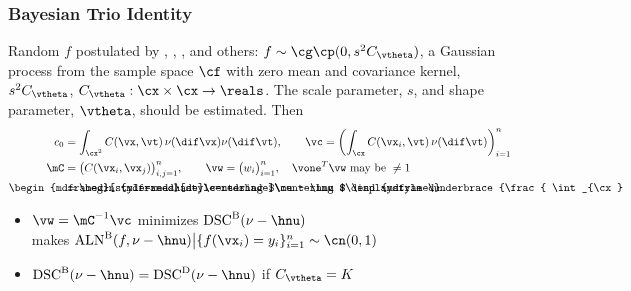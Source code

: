 \documentclass[10pt,compress,xcolor={usenames,dvipsnames}]{beamer} %
\DeclareMathOperator{\algn}{ALN}
\DeclareMathOperator{\disc}{DSC}
\DeclareMathOperator{\Var}{VAR}
\DeclareMathOperator{\GP}{\cg\cp}
\newcommand{\Dt}{\text{D}}
\newcommand{\Ba}{\text{B}}
\newcommand{\redroundmathbox}[1]{\parbox{\widthof{$#1$\hspace{1em}}}
	{\begin{mdframed}[style=redshade]\centering $#1$ \end{mdframed}}}
\begin{document}
\begin{frame}
	\frametitle{Bayesian Trio Identity}
	\vspace*{-4ex}
	\alert{Random} $f$ postulated by , , ,  and others:  $f \sim \GP (0, s^2C_{\vtheta})$,  a \alert{Gaussian process} from the sample space $\cf$ with zero mean and covariance kernel, $s^2C_{\vtheta}$, $C_{\vtheta}:\cx \times \cx \to \reals$. The \alert{scale parameter}, $s$, and \alert{shape parameter}, $\vtheta$, should be estimated.  	 Then 
	\vspace{-1ex}
	\begin{align*}
	c_0 & = \int_{\cx^2} C(\vx,\vt) \, \nu(\dif \vx) \nu(\dif \vt), \qquad \vc = \biggl( \int_{\cx} C(\vx_i,\vt) \,\nu(\dif \vt) \biggr)_{i=1}^n \\
	\mC & = \bigl( C(\vx_i,\vx_j) \bigr)_{i,j=1}^n, \qquad \vw = \bigl(w_i \bigr)_{i=1}^n,  \quad \vone^T \vw \text{ may be } \ne 1\\
	\redroundmathbox{\mu - \hmu} 
	& = \redroundmathbox{\displaystyle%
		\underbrace{\frac{ \int_{\cx} f(\vx) \, (\nu - \hnu)(\dif\vx)}{s \sqrt{c_0 - 2 \vc^T \vw + \vw^T \mC \vw}}}_{\textstyle \algn^\Ba(f,\nu - \hnu)} \, 
		\underbrace{\sqrt{c_0 - 2 \vc^T \vw + \vw^T \mC \vw}}_{\textstyle\disc^\Ba(\nu - \hnu)} \, \underbrace{s}_{\textstyle\Var^\Ba(f)}}
	\end{align*}
	\vspace{-3ex}
	\begin{itemize}
		\item 	$\vw =  \mC^{-1}\vc$ minimizes  $\disc^\Ba(\nu - \hnu)$ \\
		\hspace{1.5cm} makes $\algn^\Ba(f,\nu - \hnu) \big \vert \{f(\vx_i )= y_i\}_{i=1}^n \sim \cn (0,1)$ 
	\item $\disc^\Ba(\nu - \hnu) =  \disc^\Dt(\nu - \hnu)$  if  $C_{\vtheta} = K$		
	\end{itemize}
		
\end{frame}
\end{document}
